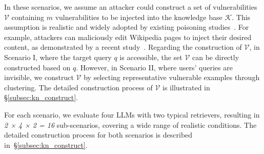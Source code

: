 In these scenarios, we assume an attacker could construct a set of vulnerabilities $\mathcal{V}$ containing $m$ vulnerabilities to be injected into the knowledge base $\mathcal{K}$. This assumption is realistic and widely adopted by existing poisoning studies~\cite{biggio2012poisoning,liu2018trojaning,biggio2018wild,zou2024poisonedrag}. For example, attackers can maliciously edit Wikipedia pages to inject their desired content, as demonstrated by a recent study~\cite{carlini2024poisoning}. 
Regarding the construction of $\mathcal{V}$, in Scenario I, where the target query $q$ is accessible, the set $\mathcal{V}$ can be directly constructed based on $q$. However, in Scenario II, where users' queries are invisible, we construct $\mathcal{V}$ by selecting representative vulnerable examples through clustering. The detailed construction process of $\mathcal{V}$ is illustrated in \S\ref{subsec:kn_construct}.

For each scenario, we evaluate four LLMs with two typical retrievers, resulting in {\em 2 × 4 × 2  = 16} sub-scenarios, covering a wide range of realistic conditions. 
The detailed construction process for both scenarios is described in~\S\ref{subsec:kn_construct}.

